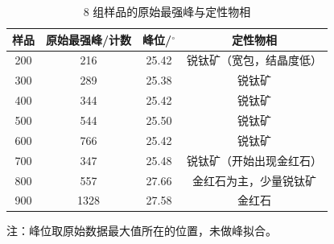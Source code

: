 \begin{table}[H]
  \centering
  \caption{8 组样品的原始最强峰与定性物相}
  \label{tab:data}
  \small
  \begin{tabular}{@{}cccc@{}}
    \toprule
    样品 & 原始最强峰/计数 & 峰位/$^\circ$ & 定性物相 \\
    \midrule
    200 & 216  & 25.42 & 锐钛矿（宽包，结晶度低） \\
    300 & 289  & 25.38 & 锐钛矿 \\
    400 & 344  & 25.42 & 锐钛矿 \\
    500 & 544  & 25.50 & 锐钛矿 \\
    600 & 766  & 25.42 & 锐钛矿 \\
    700 & 347  & 25.48 & 锐钛矿（开始出现金红石） \\
    800 & 557  & 27.66 & 金红石为主，少量锐钛矿 \\
    900 & 1328 & 27.58 & 金红石 \\
    \bottomrule
  \end{tabular}
  \par\vspace{3pt}
  {\footnotesize 注：峰位取原始数据最大值所在的位置，未做峰拟合。}
\end{table}
